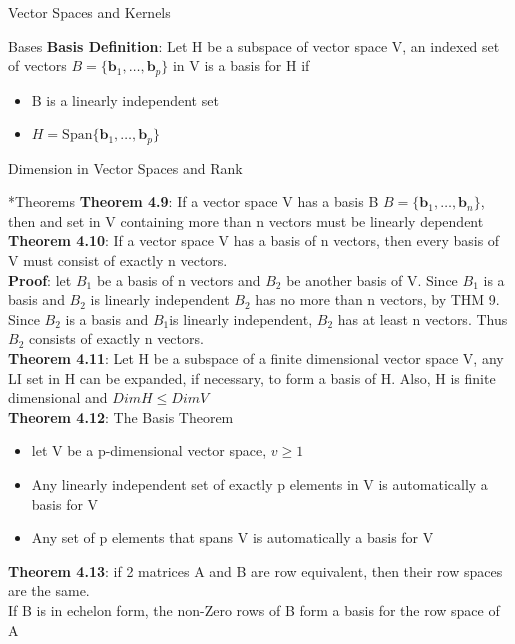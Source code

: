 \documentclass[a4paper, 12pt]{article}
\begin{document}
\begin{section}{Vector Spaces and Kernels}
\begin{subsection}{Bases}
\textbf{Basis Definition}: Let H be a subspace of vector space V,
an indexed set of vectors
$B=\{\textbf{b}_{1},\dots,\textbf{b}_{p}\}$ in V is a basis for H if
\begin{itemize}
\item{B is a linearly independent set}
\item{$H=\mbox{Span}\{\textbf{b}_{1},\dots,\textbf{b}_{p}\}$}
\end{itemize}
\end{subsection} \end{section}

\newpage
\begin{section}{Dimension in Vector Spaces and Rank}
\begin{subsection}*{Theorems}
\textbf{Theorem 4.9}: If a vector space V has a basis B
$B=\{\textbf{b}_{1},\dots,\textbf{b}_{n}\}$, then and set in V 
containing more than n vectors must be linearly dependent\\
\noindent\textbf{Theorem 4.10}: If a vector space V has a basis of
n vectors, then every basis of V must consist of exactly n vectors.
\\ \textbf{Proof}: let $B_1$ be a basis of n vectors and $B_2$ 
be another basis of V. Since $B_1$ is a basis and $B_2$ 
is linearly independent $B_2$ has no more than n vectors, by THM 9.
Since $B_2$ is a basis and $B_1$is linearly independent, $B_2$ 
has at least n vectors. Thus $B_2$ consists of exactly n vectors.
\\ \noindent \textbf{Theorem 4.11}:  Let H be a subspace of a finite
dimensional vector space V, any LI set in H can be expanded, if 
necessary, to form a basis of H. Also, H is finite dimensional and
$DimH \leq DimV$
\\ \noindent \textbf{Theorem 4.12}: The Basis Theorem\\
\begin{itemize}
\item{let V be a p-dimensional vector space, $v\geq 1$}
\item{Any linearly independent set of exactly p elements in V is automatically a 
	basis for V}
\item{Any set of p elements that spans V is automatically a basis for V}
\end{itemize}
\noindent \textbf{Theorem 4.13}: if 2 matrices A and B are row equivalent, then 
their row spaces are the same. \\
If B is in echelon form, the non-Zero rows of B form a basis for the row space of A

\end{subsection}
\end{section}
\end{document}
